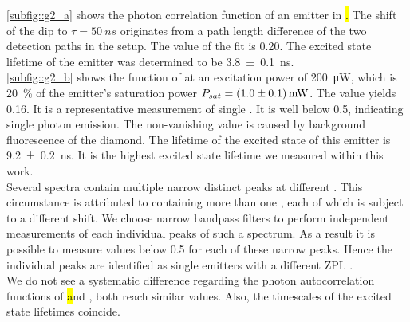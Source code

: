 		\autoref{subfig::g2_a} shows the photon correlation function of an emitter in \hl. 
		The shift of the dip to $\tau=\SI{50}{ns}$ originates from a path length difference of the two detection paths in the \HBT setup.
		The \gtz value of the fit is \num{0.20}.
		The excited state lifetime of the emitter was determined to be \SI[separate-uncertainty]{3.8\pm0.1}{ns}.
		\\
		\autoref{subfig::g2_b} shows the \gt function of \embroad at an excitation power of \SI{200}{\micro\W}, which is \SI{20}{\percent} of the emitter's saturation power $P_{sat}=\SI[separate-uncertainty]{1.0\pm0.1}{mW}$.
		The \gtz value yields \num{0.16}.
		It is a representative \gt measurement of single \sivs.
		It is well below \num{0.5}, indicating single photon emission.
		The non-vanishing \gtz value is caused by background fluorescence of the diamond.
		The lifetime of the excited state of this emitter is \SI[separate-uncertainty]{9.2\pm0.2}{ns}.
		It is the highest excited state lifetime we measured within this work.
		\\
		Several \nd \pl spectra contain multiple narrow distinct peaks at different \wls.
		This circumstance is attributed to \nds containing more than one \siv, each of which is subject to a different \ZPL \wl shift.
		We choose narrow bandpass filters to perform independent measurements of each individual peaks of such a spectrum.
		As a result it is possible to measure \gtz values below \num{0.5} for each of these narrow peaks.
		Hence the individual peaks are identified as single emitters with a different ZPL \cwl.
		\\
		We do not see a systematic difference regarding the photon autocorrelation functions of \hl and \vl, both reach similar \gtz values.
		Also, the timescales of the excited state lifetimes coincide.
